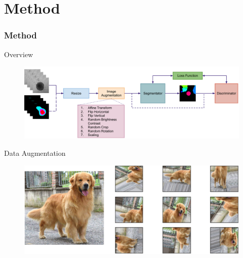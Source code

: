 \section{Method}


\begin{frame}{}
    \frametitle{Method}
\end{frame}


\begin{frame}{Overview}
    \begin{figure}[!htb]
    \centering
        \includegraphics[width=15cm]{figures/method/overview}
        \label{fig:method_overview}
    \end{figure}
\end{frame}


\begin{frame}{Data Augmentation}
    \begin{figure}
        \centering
        \includegraphics[width=13cm]{figures/method/data_augmentation}
    \end{figure}
\end{frame}


